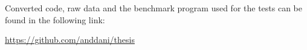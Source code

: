 
Converted code, raw data and the benchmark program used for the tests can be found in the following link:

\begin{center}
    \url{https://github.com/anddani/thesis}
\end{center}



% 
%
% 
%
% 
%
% 
%
% 
